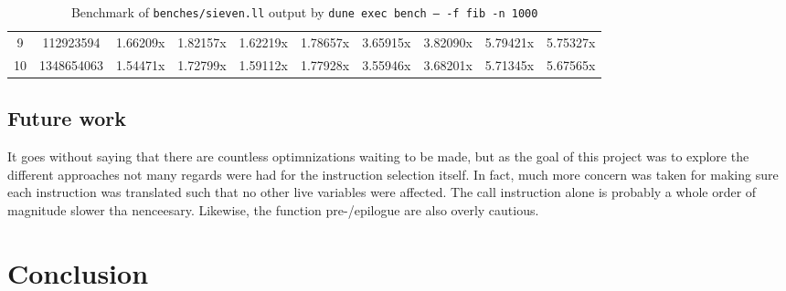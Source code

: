 \documentclass{article}
\begin{document}
\begin{table}[H]
{\begin{NiceTabular}{|c|ccccccccc|}
9 &  112923594&  1.66209x&  1.82157x&  1.62219x&  1.78657x&  3.65915x&  3.82090x&  5.79421x&  5.75327x\\
10 &  1348654063&  1.54471x&  1.72799x&  1.59112x&  1.77928x&  3.55946x&  3.68201x&  5.71345x&  5.67565x\\
\hline
\end{NiceTabular}}
\caption{\label{tab:fannkuch}Benchmark of \texttt{benches/sieven.ll} output by \texttt{dune exec bench -- -f fib -n 1000}}
\end{table}






\subsection{Future work}

It goes without saying that there are countless optimnizations waiting to be made, but as the goal of this project was to explore the different approaches not many regards were had for the instruction selection itself. In fact, much more concern was taken for making sure each instruction was translated such that no other live variables were affected. The call instruction alone is probably a whole order of magnitude slower tha nenceesary. Likewise, the function pre-/epilogue are also overly cautious.


\section{Conclusion}
\end{document}
